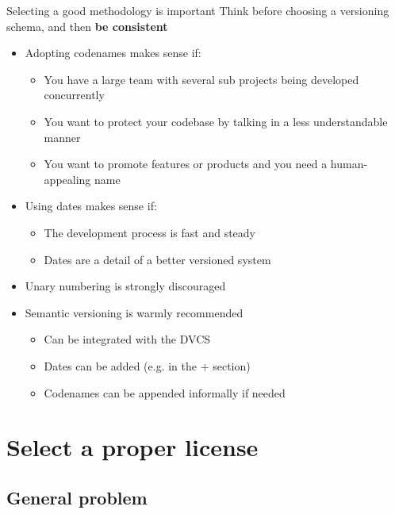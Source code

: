\documentclass[presentation]{beamer}
\begin{document}
\begin{frame}{Selecting a good methodology is important}
    Think before choosing a versioning schema, and then \textbf{be consistent}
    \begin{itemize}
        \item Adopting codenames makes sense if:
        \begin{itemize}
            \item You have a large team with several sub projects being developed concurrently
            \item You want to protect your codebase by talking in a less understandable manner
            \item You want to promote features or products and you need a human-appealing name
        \end{itemize}
        \item Using dates makes sense if:
        \begin{itemize}
            \item The development process is fast and steady
            \item Dates are a detail of a better versioned system
        \end{itemize}
        \item Unary numbering is strongly discouraged
        \item Semantic versioning is warmly recommended
        \begin{itemize}
            \item Can be integrated with the DVCS
            \item Dates can be added (e.g. in the + section)
            \item Codenames can be appended informally if needed
        \end{itemize}
    \end{itemize}
\end{frame}

\section{Select a proper license}

\subsection{General problem}
\end{document}
